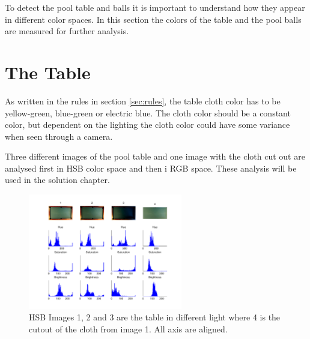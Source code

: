 To detect the pool table and balls it is important to understand how they appear in different color spaces. In this section the colors of the table and the pool balls are measured for further analysis.

\section{The Table}
As written in the rules in section \ref{sec:rules}, the table cloth color has to be yellow-green, blue-green or electric blue. The cloth color should be a constant color, but dependent on the lighting the cloth color could have some variance when seen through a camera.

Three different images of the pool table and one image with the cloth cut out are analysed first in HSB color space and then i RGB space. These analysis will be used in the solution chapter.

\begin{figure}[H]
\begin{center}
\leavevmode
\includegraphics[width=0.6\textwidth]{images/hsv_hist_table}
\end{center}
\caption{HSB Images 1, 2 and 3 are the table in different light where 4 is the cutout of the cloth from image 1. All axis are aligned.}
\label{fig:tablehsv}
\end{figure} 

